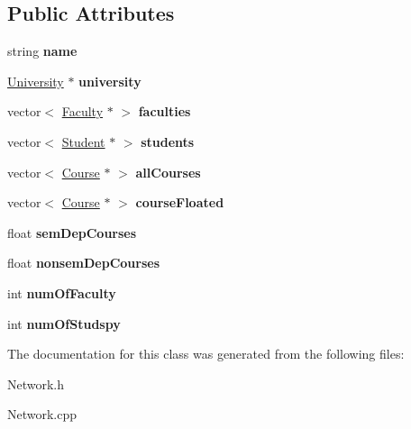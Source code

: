 \subsection*{\-Public \-Attributes}
\begin{DoxyCompactItemize}
\item 
\hypertarget{classDepartment_a914dfcfd923227e55273099dc59e3aff}{string {\bfseries name}}\label{classDepartment_a914dfcfd923227e55273099dc59e3aff}

\item 
\hypertarget{classDepartment_abc835e7575415f4178c7dec9f6ee9a16}{\hyperlink{classUniversity}{\-University} $\ast$ {\bfseries university}}\label{classDepartment_abc835e7575415f4178c7dec9f6ee9a16}

\item 
\hypertarget{classDepartment_ac23aeae9e05e5a8dd7c11ac547786ad8}{vector$<$ \hyperlink{classFaculty}{\-Faculty} $\ast$ $>$ {\bfseries faculties}}\label{classDepartment_ac23aeae9e05e5a8dd7c11ac547786ad8}

\item 
\hypertarget{classDepartment_a3bb0540d91e0acd9de599d26223ba2df}{vector$<$ \hyperlink{classStudent}{\-Student} $\ast$ $>$ {\bfseries students}}\label{classDepartment_a3bb0540d91e0acd9de599d26223ba2df}

\item 
\hypertarget{classDepartment_a92387bb2c4493d0b86f45c3760212138}{vector$<$ \hyperlink{classCourse}{\-Course} $\ast$ $>$ {\bfseries all\-Courses}}\label{classDepartment_a92387bb2c4493d0b86f45c3760212138}

\item 
\hypertarget{classDepartment_acecaee2ec4832f5232707d4ba33658c4}{vector$<$ \hyperlink{classCourse}{\-Course} $\ast$ $>$ {\bfseries course\-Floated}}\label{classDepartment_acecaee2ec4832f5232707d4ba33658c4}

\item 
\hypertarget{classDepartment_ac50288c49ec00d4c230476c0ca259b3d}{float {\bfseries sem\-Dep\-Courses}}\label{classDepartment_ac50288c49ec00d4c230476c0ca259b3d}

\item 
\hypertarget{classDepartment_a6adffbd8935120b7246e21f580059059}{float {\bfseries nonsem\-Dep\-Courses}}\label{classDepartment_a6adffbd8935120b7246e21f580059059}

\item 
\hypertarget{classDepartment_a9685a46a2f1ca5e4bc4a71772ac1038d}{int {\bfseries num\-Of\-Faculty}}\label{classDepartment_a9685a46a2f1ca5e4bc4a71772ac1038d}

\item 
\hypertarget{classDepartment_a3f285bf468720eae8350353a9e088165}{int {\bfseries num\-Of\-Studspy}}\label{classDepartment_a3f285bf468720eae8350353a9e088165}

\end{DoxyCompactItemize}


\-The documentation for this class was generated from the following files\-:\begin{DoxyCompactItemize}
\item 
\-Network.\-h\item 
\-Network.\-cpp\end{DoxyCompactItemize}
